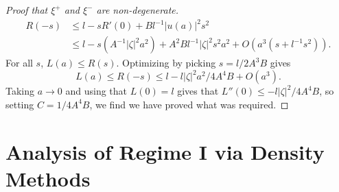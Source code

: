 \begin{proof}[Proof that $\xi^+$ and $\xi^-$ are non-degenerate]
    \begin{equation}
    \begin{split}
        R(-s) &\leq l - s R'(0) + B l^{-1} |u(a)|^2 s^2\\
        &\leq l - s ( A^{-1} |\zeta|^2 a^2 ) + A^2 B l^{-1} |\zeta|^2 s^2 a^2 + O(a^3 ( s + l^{-1} s^2)).
    \end{split}
    \end{equation}
    For all $s$, $L(a) \leq R(s)$. Optimizing by picking $s = l / 2 A^3 B$ gives
    \begin{equation}
        L(a) \leq R(-s) \leq l - l |\zeta|^2 a^2 / 4 A^4 B + O( a^3 ).
    \end{equation}
    Taking $a \to 0$ and using that $L(0) = l$ gives that $L''(0) \leq - l |\zeta|^2 / 4 A^4 B$, so setting $C = 1/4 A^4 B$, we find we have proved what was required.
\end{proof}

\section{Analysis of Regime I via Density Methods} \label{regime1firstsection}

